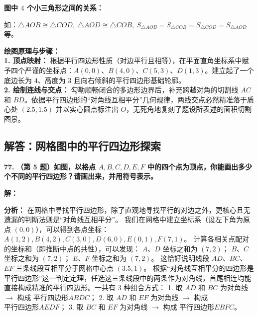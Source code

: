 \vspace{0.4cm}
\textbf{图中 $4$ 个小三角形之间的关系：}

如：$\triangle AOB \cong \triangle COD,\ \triangle AOD \cong \triangle COB,\ S_{\triangle AOB} = S_{\triangle COB} = S_{\triangle COD} = S_{\triangle AOD}$ 等。

\vspace{0.4cm}
{\small\color{blue!70!black}
\textbf{绘图原理与步骤：}\\
\textbf{1. 顶点映射：} 根据平行四边形性质（对边平行且相等），在平面直角坐标系中赋予四个严谨的坐标点：$A(0, 0)$、$B(4, 0)、C(5, 3)、D(1, 3)$。建立起了一个底边长为 $4$、高度为 $3$ 且向右倾斜的平行四边形基础轮廓。\\
\textbf{2. 绘制连线与交点：} 勾勒顺畅闭合的多边形边界后，补充跨越对角的切割线 $AC$ 和 $BD$。依据平行四边形的“对角线互相平分”几何规律，两线交点必然精准落于质心处 $(2.5, 1.5)$ 并以实心圆点标注出 $O$，无死角地复刻了题设所表述的面积切割图景。
}

\newpage

\newpage

\subsection{解答：网格图中的平行四边形探索}

\vspace{0.6cm}

\textbf{\LARGE 77.} \textbf{（第 5 题）如图，以格点 $A, B, C, D, E, F$ 中的四个点为顶点，你能画出多少个不同的平行四边形？请画出来，并用符号表示。}

\vspace{0.4cm}
\textbf{解：}

\textbf{分析：} 在网格中寻找平行四边形，除了直观地寻找平行的对边之外，更核心且无遗漏的判断法则是“对角线互相平分”。
我们在网格中建立坐标系（设左下角为原点 $(0,0)$），可以得到各点坐标：
$A(1,2), B(4,2), C(3,0), D(6,0), E(0,1), F(7,1)$。
计算各相关点配对的坐标和（即推断中点的共性），可以发现：
$A$、$D$ 坐标之和为 $(7,2)$；
$B$、$C$ 坐标之和为 $(7,2)$；
$E$、$F$ 坐标之和为 $(7,2)$。
这恰好说明线段 $AD$、$BC$、$EF$ 三条线段互相平分于网格中心点 $(3.5, 1)$。
根据“对角线互相平分的四边形是平行四边形”这一判定定理，任选这三条线段中的两条作为对角线，首尾相连均能直接构成精准的平行四边形。一共有 $3$ 种组合方式：
1. 取 $AD$ 和 $BC$ 为对角线 $\to$ 构成 $\text{平行四边形} ABDC$；
2. 取 $AD$ 和 $EF$ 为对角线 $\to$ 构成 $\text{平行四边形} AEDF$；
3. 取 $BC$ 和 $EF$ 为对角线 $\to$ 构成 $\text{平行四边形} EBFC$。

